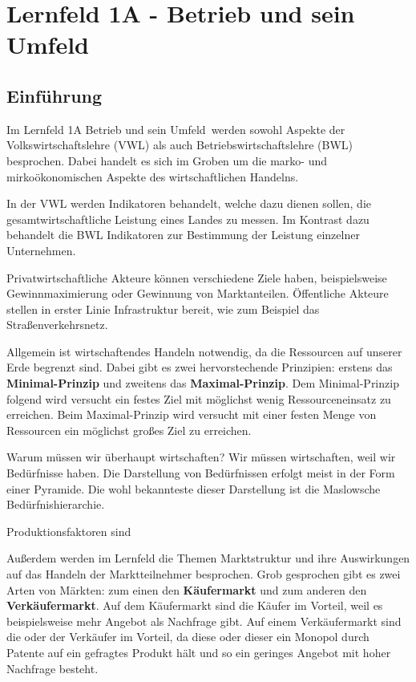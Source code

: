 \section{Lernfeld 1A - Betrieb und sein Umfeld}

\subsection{Einführung}
Im Lernfeld 1A \ql Betrieb und sein Umfeld\qr\ werden sowohl Aspekte der Volkswirtschaftslehre (VWL) als auch Betriebswirtschaftslehre (BWL) besprochen. Dabei handelt es sich im Groben um die marko- und mirkoökonomischen Aspekte des wirtschaftlichen Handelns.

In der VWL werden Indikatoren behandelt, welche dazu dienen sollen, die gesamtwirtschaftliche Leistung eines Landes zu messen. Im Kontrast dazu behandelt die BWL Indikatoren zur Bestimmung der Leistung einzelner Unternehmen.

Privatwirtschaftliche Akteure können verschiedene Ziele haben, beispielsweise Gewinnmaximierung oder Gewinnung von Marktanteilen. Öffentliche Akteure stellen in erster Linie Infrastruktur bereit, wie zum Beispiel das Straßenverkehrsnetz.

Allgemein ist wirtschaftendes Handeln notwendig, da die Ressourcen auf unserer Erde begrenzt sind. Dabei gibt es zwei hervorstechende Prinzipien: erstens das {\bf Minimal-Prinzip} und zweitens das {\bf Maximal-Prinzip}. Dem Minimal-Prinzip folgend wird versucht ein festes Ziel mit möglichst wenig Ressourceneinsatz zu erreichen. Beim Maximal-Prinzip wird versucht mit einer festen Menge von Ressourcen ein möglichst großes Ziel zu erreichen.

Warum müssen wir überhaupt wirtschaften? Wir müssen wirtschaften, weil wir Bedürfnisse haben. Die Darstellung von Bedürfnissen erfolgt meist in der Form einer Pyramide. Die wohl bekannteste dieser Darstellung ist die Maslowsche Bedürfnishierarchie.

Produktionsfaktoren sind


Außerdem werden im Lernfeld die Themen Marktstruktur und ihre Auswirkungen auf das Handeln der Marktteilnehmer besprochen. Grob gesprochen gibt es zwei Arten von Märkten: zum einen den {\bf Käufermarkt} und zum anderen den {\bf Verkäufermarkt}. Auf dem Käufermarkt sind die Käufer im Vorteil, weil es beispielsweise mehr Angebot als Nachfrage gibt. Auf einem Verkäufermarkt sind die oder der Verkäufer im Vorteil, da diese oder dieser ein Monopol durch Patente auf ein gefragtes Produkt hält und so ein geringes Angebot mit hoher Nachfrage besteht.

